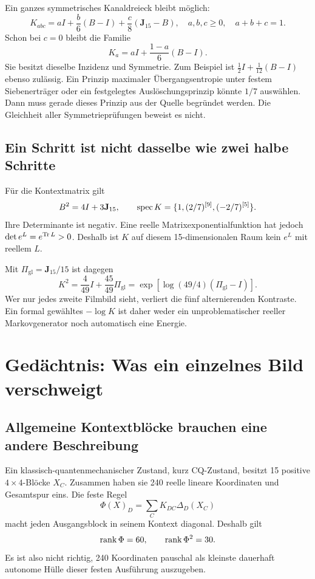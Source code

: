 Ein ganzes symmetrisches Kanaldreieck bleibt möglich:
\begin{equation}
K_{abc}=aI+\frac b6(B-I)+\frac c8(\mathbf J_{15}-B),
\quad a,b,c\ge0,\quad a+b+c=1.
\end{equation}
Schon bei $c=0$ bleibt die Familie
\begin{equation}
K_a=aI+\frac{1-a}{6}(B-I).
\end{equation}
Sie besitzt dieselbe Inzidenz und Symmetrie. Zum Beispiel ist $\frac12I+\frac1{12}(B-I)$ ebenso zulässig. Ein Prinzip maximaler Übergangsentropie unter festem Siebenerträger oder ein festgelegtes Auslöschungsprinzip könnte $1/7$ auswählen. Dann muss gerade dieses Prinzip aus der Quelle begründet werden. Die Gleichheit aller Symmetrieprüfungen beweist es nicht. 

\section{Ein Schritt ist nicht dasselbe wie zwei halbe Schritte}
Für die Kontextmatrix gilt
\begin{equation}
B^2=4I+3\mathbf J_{15},\qquad
\operatorname{spec} K=\{1,(2/7)^{[9]},(-2/7)^{[5]}\}.
\end{equation}
Ihre Determinante ist negativ. Eine reelle Matrixexponentialfunktion hat jedoch $\det e^L=e^{\operatorname{Tr} L}>0$. Deshalb ist $K$ auf diesem 15-dimensionalen Raum kein $e^L$ mit reellem $L$.

Mit $\Pi_{\mathrm{gl}}=\mathbf J_{15}/15$ ist dagegen
\begin{equation}
K^2=\frac4{49}I+\frac{45}{49}\Pi_{\mathrm{gl}}
=\exp\!\left[\log(49/4)(\Pi_{\mathrm{gl}}-I)\right].
\end{equation}
Wer nur jedes zweite Filmbild sieht, verliert die fünf alternierenden Kontraste. Ein formal gewähltes $-\log K$ ist daher weder ein unproblematischer reeller Markovgenerator noch automatisch eine Energie.

\chapter{Gedächtnis: Was ein einzelnes Bild verschweigt}
\label{ch:memory}
\section{Allgemeine Kontextblöcke brauchen eine andere Beschreibung}
Ein klassisch-quantenmechanischer Zustand, kurz CQ-Zustand, besitzt 15 positive $4\times4$-Blöcke $X_C$. Zusammen haben sie 240 reelle lineare Koordinaten und Gesamtspur eins. Die feste Regel
\begin{equation}
\Phi(X)_D=\sum_CK_{DC}\Delta_D(X_C)
\end{equation}
macht jeden Ausgangsblock in seinem Kontext diagonal. Deshalb gilt
\begin{equation}
\operatorname{rank}\Phi=60,\qquad\operatorname{rank}\Phi^2=30.
\end{equation}
Es ist also nicht richtig, 240 Koordinaten pauschal als kleinste dauerhaft autonome Hülle dieser festen Ausführung auszugeben.

